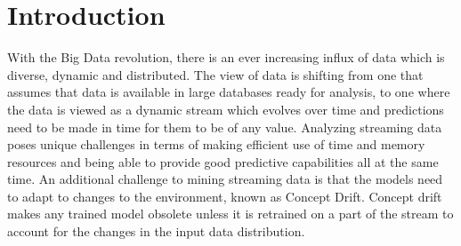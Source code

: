 \documentclass[conference]{IEEEtran}
\begin{document}
%



\section{Introduction}
With the Big Data revolution, there is an ever increasing influx  of data which is diverse, dynamic and distributed. The view of data is shifting from one that assumes that data is available in large databases ready for analysis, to one where the data is viewed as a dynamic stream which evolves over time and predictions need to be made in time for them to be of any value. Analyzing streaming data poses unique challenges in terms of making efficient use of time and memory resources and being able to provide good predictive capabilities all at the same time. An additional challenge to mining streaming data is that the models need to adapt to changes to the environment, known as Concept Drift\cite{Tsymbal(2004)}\cite{Zliobaite(2009)}. Concept drift makes any trained model obsolete unless it is retrained on a part of the stream to account for the changes in the input data distribution.
\end{document}
